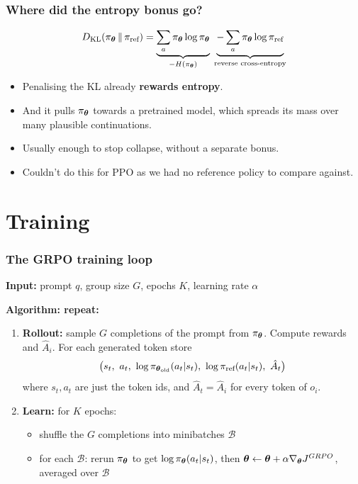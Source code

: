 \begin{frame}
    \frametitle{Where did the entropy bonus go?}
    $$
    D_{\mathrm{KL}}(\pi_{\boldsymbol{\theta}} \,\|\, \pi_{\text{ref}})
    = \underbrace{\sum_a \pi_{\boldsymbol{\theta}} \log \pi_{\boldsymbol{\theta}}}_{-H(\pi_{\boldsymbol{\theta}})}
    \;\underbrace{- \sum_a \pi_{\boldsymbol{\theta}} \log \pi_{\text{ref}}}_{\text{reverse cross-entropy}}
    $$
    \pause
    \begin{itemize}
        \item Penalising the KL already \textbf{rewards entropy}.
        \item And it pulls $\pi_{\boldsymbol{\theta}}$ towards a pretrained model, which spreads its mass over
        many plausible continuations.
        \item Usually enough to stop collapse, without a separate bonus.
        \item Couldn't do this for PPO as we had no reference policy to compare against.
    \end{itemize}
\end{frame}

\section{Training}

\begin{frame}
    \frametitle{The GRPO training loop}
    \textbf{Input:} prompt $q$, group size $G$, epochs $K$, learning rate $\alpha$

    \textbf{Algorithm: repeat:}
    \begin{enumerate}
        \item \textbf{Rollout:} sample $G$ completions of the prompt from $\pi_{\boldsymbol{\theta}}$.
        Compute rewards and $\hat{A}_i$. For each generated token store
        $$
        \big(s_t,\ a_t,\ \log \piold(a_t|s_t),\ \log \piref(a_t|s_t),\ \hat{A}_t\big)
        $$
        where $s_t, a_t$ are just the token ids, and $\hat{A}_t = \hat{A}_i$ for every token of $o_i$.
        \item \textbf{Learn:} for $K$ epochs:
        \begin{itemize}
            \item shuffle the $G$ completions into minibatches $\mathcal{B}$
            \item for each $\mathcal{B}$: rerun $\pi_{\boldsymbol{\theta}}$ to get $\log \pi_{\boldsymbol{\theta}}(a_t|s_t)$, then
            ${\boldsymbol{\theta}} \leftarrow {\boldsymbol{\theta}} + \alpha \nabla_{\boldsymbol{\theta}} J^{GRPO}$, averaged over $\mathcal{B}$
        \end{itemize}
    \end{enumerate}
\end{frame}

